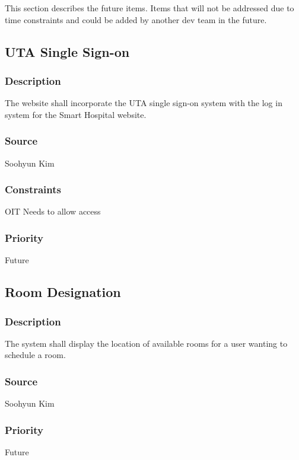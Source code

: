 This section describes the future items. Items that will not be addressed due to time constraints and could be added by another dev team in the future.

\subsection{UTA Single Sign-on}
\subsubsection{Description}
The website shall incorporate the UTA single sign-on system with the log in system for the Smart Hospital website.
\subsubsection{Source}
Soohyun Kim
\subsubsection{Constraints}
OIT Needs to allow access
\subsubsection{Priority}
Future

\subsection{Room Designation}
\subsubsection{Description}
The system shall display the location of available rooms for a user wanting to schedule a room.
\subsubsection{Source}
Soohyun Kim
\subsubsection{Priority}
Future